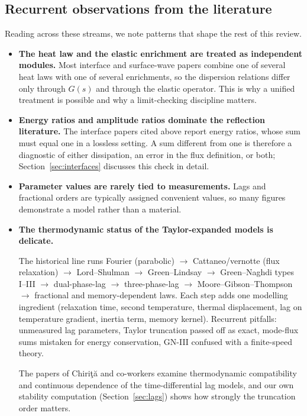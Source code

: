 \subsection{Recurrent observations from the literature}
Reading across these streams, we note patterns that shape the rest of this review.
\begin{itemize}
\item \textbf{The heat law and the elastic enrichment are treated as independent modules.} Most interface and surface-wave papers combine one of several heat laws with one of several enrichments, so the dispersion relations differ only through $G(s)$ and through the elastic operator. This is why a unified treatment is possible and why a limit-checking discipline matters.
\item \textbf{Energy ratios and amplitude ratios dominate the reflection literature.} The interface papers cited above report energy ratios, whose sum must equal one in a lossless setting. A sum different from one is therefore a diagnostic of either dissipation, an error in the flux definition, or both; Section~\ref{sec:interfaces} discusses this check in detail.
\item \textbf{Parameter values are rarely tied to measurements.} Lags and fractional orders are typically assigned convenient values, so many figures demonstrate a model rather than a material.
\item \textbf{The thermodynamic status of the Taylor-expanded models is delicate.}

\begin{summarybox}[Summary]
The historical line runs Fourier (parabolic) $\to$ Cattaneo/vernotte (flux relaxation) $\to$ Lord--Shulman $\to$ Green--Lindsay $\to$ Green--Naghdi types I--III $\to$ dual-phase-lag $\to$ three-phase-lag $\to$ Moore--Gibson--Thompson $\to$ fractional and memory-dependent laws. Each step adds one modelling ingredient (relaxation time, second temperature, thermal displacement, lag on temperature gradient, inertia term, memory kernel). Recurrent pitfalls: unmeasured lag parameters, Taylor truncation passed off as exact, mode-flux sums mistaken for energy conservation, GN-III confused with a finite-speed theory.
\end{summarybox} The papers of Chiri\c{t}\u{a} and co-workers \citep{Chirita2016,Tibullo2017} examine thermodynamic compatibility and continuous dependence of the time-differential lag models, and our own stability computation (Section~\ref{sec:lags}) shows how strongly the truncation order matters.
\end{itemize}

